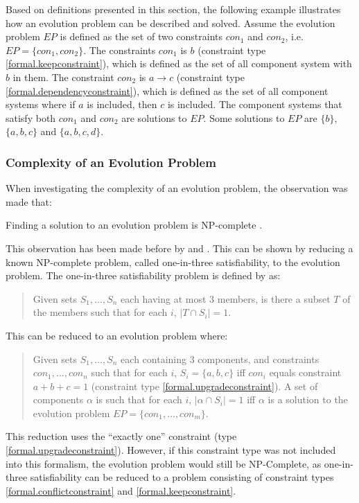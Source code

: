 Based on definitions presented in this section, the following example illustrates how an evolution problem can be described and solved.
Assume the evolution problem $EP$ is defined as the set of two constraints $con_1$ and $con_2$, i.e. $EP = \{con_1,con_2\}$.
The constraints $con_1$ is $b$ (constraint type \ref{formal.keepconstraint}), which is defined as the set of all component system with $b$ in them.
The constraint $con_2$ is $a \rightarrow c$ (constraint type \ref{formal.dependencyconstraint}), which is defined as the set of all component systems where if $a$ is included, then $c$ is included.
The component systems that satisfy both $con_1$ and $con_2$ are solutions to $EP$.
Some solutions to $EP$ are $\{b\}$, $\{a,b,c\}$ and $\{a,b,c,d\}$.

\subsubsection{Complexity of an Evolution Problem}
When investigating the complexity of an evolution problem, the observation was made that:
\begin{obs}
Finding a solution to an evolution problem is NP-complete \citep{cook1971}.
\end{obs}
This observation has been made before by \cite{Mancinelli2006} and \cite{abate2011}.
This can be shown by reducing a known NP-complete problem, called one-in-three satisfiability, to the evolution problem.
The one-in-three satisfiability problem is defined by \cite{Schaefer1978} as:
\begin{quote}
Given sets $S_1, \ldots, S_n$ each having at most 3 members, is there a subset $T$ of the members such that for each $i$, $|T \cap S_i|  =  1$.
\end{quote}

This can be reduced to an evolution problem where:
\begin{quote}
Given sets $S_1, \ldots, S_n$ each containing 3 components, and constraints $con_1,\ldots,con_n$
such that for each $i$, $S_i = \{a,b,c\}$ iff $con_i$ equals constraint $a + b + c = 1$ (constraint type \ref{formal.upgradeconstraint}).
A set of components $\alpha$ is such that for each $i$, $|\alpha \cap S_i|  =  1$ iff $\alpha$ is a solution to the evolution problem $EP = \{con_1,\ldots,con_m\}$.
\end{quote}

This reduction uses the ``exactly one'' constraint (type \ref{formal.upgradeconstraint}).
However, if this constraint type was not included into this formalism, the evolution problem would still be NP-Complete,
as one-in-three satisfiability can be reduced to a problem consisting of  constraint types \ref{formal.conflictconstraint} and \ref{formal.keepconstraint}.

